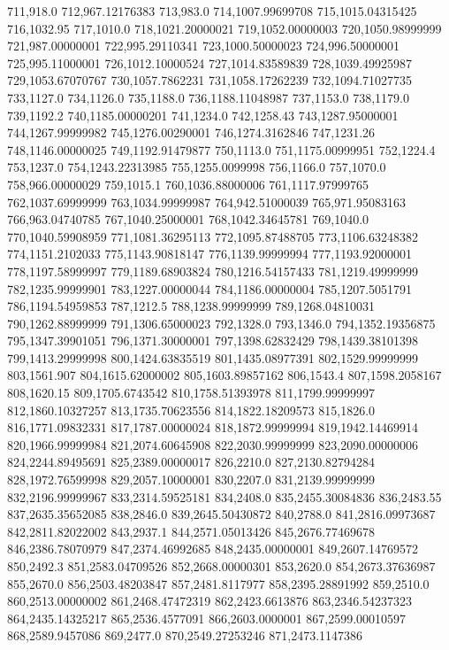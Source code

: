 711,918.0
712,967.12176383
713,983.0
714,1007.99699708
715,1015.04315425
716,1032.95
717,1010.0
718,1021.20000021
719,1052.00000003
720,1050.98999999
721,987.00000001
722,995.29110341
723,1000.50000023
724,996.50000001
725,995.11000001
726,1012.10000524
727,1014.83589839
728,1039.49925987
729,1053.67070767
730,1057.7862231
731,1058.17262239
732,1094.71027735
733,1127.0
734,1126.0
735,1188.0
736,1188.11048987
737,1153.0
738,1179.0
739,1192.2
740,1185.00000201
741,1234.0
742,1258.43
743,1287.95000001
744,1267.99999982
745,1276.00290001
746,1274.3162846
747,1231.26
748,1146.00000025
749,1192.91479877
750,1113.0
751,1175.00999951
752,1224.4
753,1237.0
754,1243.22313985
755,1255.0099998
756,1166.0
757,1070.0
758,966.00000029
759,1015.1
760,1036.88000006
761,1117.97999765
762,1037.69999999
763,1034.99999987
764,942.51000039
765,971.95083163
766,963.04740785
767,1040.25000001
768,1042.34645781
769,1040.0
770,1040.59908959
771,1081.36295113
772,1095.87488705
773,1106.63248382
774,1151.2102033
775,1143.90818147
776,1139.99999994
777,1193.92000001
778,1197.58999997
779,1189.68903824
780,1216.54157433
781,1219.49999999
782,1235.99999901
783,1227.00000044
784,1186.00000004
785,1207.5051791
786,1194.54959853
787,1212.5
788,1238.99999999
789,1268.04810031
790,1262.88999999
791,1306.65000023
792,1328.0
793,1346.0
794,1352.19356875
795,1347.39901051
796,1371.30000001
797,1398.62832429
798,1439.38101398
799,1413.29999998
800,1424.63835519
801,1435.08977391
802,1529.99999999
803,1561.907
804,1615.62000002
805,1603.89857162
806,1543.4
807,1598.2058167
808,1620.15
809,1705.6743542
810,1758.51393978
811,1799.99999997
812,1860.10327257
813,1735.70623556
814,1822.18209573
815,1826.0
816,1771.09832331
817,1787.00000024
818,1872.99999994
819,1942.14469914
820,1966.99999984
821,2074.60645908
822,2030.99999999
823,2090.00000006
824,2244.89495691
825,2389.00000017
826,2210.0
827,2130.82794284
828,1972.76599998
829,2057.10000001
830,2207.0
831,2139.99999999
832,2196.99999967
833,2314.59525181
834,2408.0
835,2455.30084836
836,2483.55
837,2635.35652085
838,2846.0
839,2645.50430872
840,2788.0
841,2816.09973687
842,2811.82022002
843,2937.1
844,2571.05013426
845,2676.77469678
846,2386.78070979
847,2374.46992685
848,2435.00000001
849,2607.14769572
850,2492.3
851,2583.04709526
852,2668.00000301
853,2620.0
854,2673.37636987
855,2670.0
856,2503.48203847
857,2481.8117977
858,2395.28891992
859,2510.0
860,2513.00000002
861,2468.47472319
862,2423.6613876
863,2346.54237323
864,2435.14325217
865,2536.4577091
866,2603.0000001
867,2599.00010597
868,2589.9457086
869,2477.0
870,2549.27253246
871,2473.1147386
